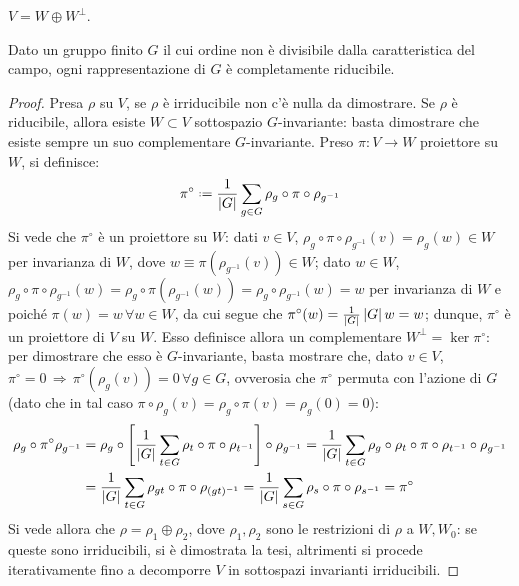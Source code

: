 \begin{propcorollary}
	$ V = W \oplus W^{\perp} $.
\end{propcorollary}

\begin{theorem}[Maschke]
	Dato un gruppo finito $ G $ il cui ordine non è divisibile dalla caratteristica del campo, ogni rappresentazione di $ G $ è completamente riducibile.
\end{theorem}
\begin{proof}
	Presa $ \rho $ su $ V $, se $ \rho $ è irriducibile non c'è nulla da dimostrare.
	Se $ \rho $ è riducibile, allora esiste $ W \subset V $ sottospazio $ G $-invariante: basta dimostrare che esiste sempre un suo complementare $ G $-invariante.
	Preso $ \pi : V \rightarrow W $ proiettore su $ W $, si definisce:
	\begin{equation*}
		\pi^{\circ} \defeq \frac{1}{\abs{G}} \sum_{g \in G} \rho_g \circ \pi \circ \rho_{g^{-1}}
	\end{equation*}
	Si vede che $ \pi^{\circ} $ è un proiettore su $ W $: dati $ v \in V $, $ \rho_g \circ \pi \circ \rho_{g^{-1}} (v) = \rho_g (w) \in W $ per invarianza di $ W $, dove $ w \equiv \pi(\rho_{g^{-1}}(v)) \in W $; dato $ w \in W $, $ \rho_g \circ \pi \circ \rho_{g^{-1}}(w) = \rho_g \circ \pi(\rho_{g^{-1}}(w)) = \rho_g \circ \rho_{g^{-1}}(w) = w $ per invarianza di $ W $ e poiché $ \pi(w) = w \,\forall w \in W $, da cui segue che $ \pi^{\circ}(w) = \frac{1}{\left\lvert G\right\rvert} \left\lvert G\right\rvert w = w $; dunque, $ \pi^{\circ} $ è un proiettore di $ V $ su $ W $. Esso definisce allora un complementare $ W^{\perp} = \ker \pi^{\circ} $: per dimostrare che esso è $ G $-invariante, basta mostrare che, dato $ v \in V $, $ \pi^{\circ} = 0 \,\Rightarrow\, \pi^{\circ}(\rho_g(v)) = 0 \,\forall g \in G $, ovverosia che $ \pi^{\circ} $ permuta con l'azione di $ G $ (dato che in tal caso $ \pi \circ \rho_g (v) = \rho_g \circ \pi(v) = \rho_g (0) = 0 $):
	\begin{equation*}
		\begin{split}
			\rho_g \circ \pi^{\circ} \rho_{g^{-1}} 
			&= \rho_g \circ \left[ \frac{1}{\left\lvert G\right\rvert} \sum_{t \in G} \rho_t \circ \pi \circ \rho_{t^{-1}} \right] \circ \rho_{g^{-1}} = \frac{1}{\left\lvert G\right\rvert} \sum_{t \in G} \rho_g \circ \rho_t \circ \pi \circ \rho_{t^{-1}} \circ \rho_{g^{-1}}\\
			&= \frac{1}{\left\lvert G\right\rvert} \sum_{t \in G} \rho_{gt} \circ \pi \circ \rho_{(gt)^{-1}} = \frac{1}{\left\lvert G\right\rvert} \sum_{s \in G} \rho_s \circ \pi \circ \rho_{s^{-1}} = \pi^{\circ}
		\end{split}
	\end{equation*}
	Si vede allora che $ \rho = \rho_1 \oplus \rho_2 $, dove $ \rho_1,\rho_2 $ sono le restrizioni di $ \rho $ a $ W,W_0 $: se queste sono irriducibili, si è dimostrata la tesi, altrimenti si procede iterativamente fino a decomporre $ V $ in sottospazi invarianti irriducibili.
\end{proof}

